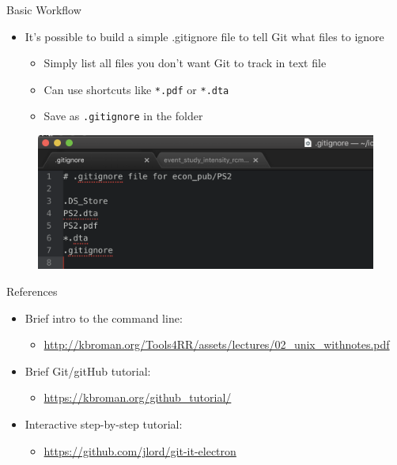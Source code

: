 \documentclass[12pt]{beamer}
\begin{document}
\begin{frame}{Basic Workflow}

\begin{itemize}
	\item It's possible to build a simple .gitignore file to tell Git what files to ignore
\vspace{.4cm}

\begin{itemize}
	\item Simply list all files you don't want Git to track in text file
	\vspace{.2cm}
	\item Can use shortcuts like \texttt{*.pdf} or \texttt{*.dta}
	\vspace{.2cm}
	\item Save as \texttt{.gitignore} in the folder
\end{itemize}
\end{itemize}
	\begin{figure}
	\includegraphics[scale=0.5]{figures/gitignore.png}
\end{figure}
\end{frame}



\begin{frame}{References}
\begin{itemize}
	\item Brief intro to the command line:
	\begin{itemize}
		\item  \url{http://kbroman.org/Tools4RR/assets/lectures/02_unix_withnotes.pdf}
	\end{itemize}
	\vspace{.6cm}
	\item Brief Git/gitHub tutorial:
\begin{itemize}
	\item   \url{https://kbroman.org/github_tutorial/}
\end{itemize}
	\vspace{.6cm}
	\item Interactive step-by-step tutorial:
\begin{itemize}
	\item   \url{https://github.com/jlord/git-it-electron}
\end{itemize}
\end{itemize}







\end{frame}
\end{document}
